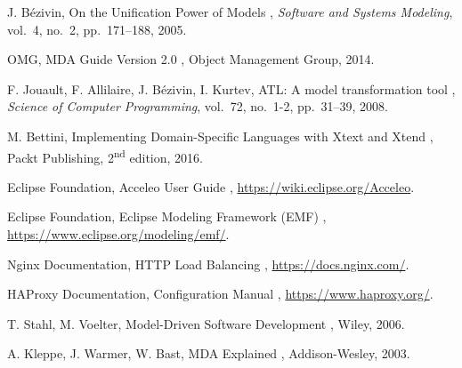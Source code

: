 \documentclass[12pt,a4paper]{report}
\begin{document}
\begin{enumerate}[label={[\arabic*]}]
  \item J. Bézivin, \og On the Unification Power of Models \fg{}, \textit{Software and Systems Modeling}, vol.~4, no.~2, pp.~171--188, 2005.
  \item OMG, \og MDA Guide Version 2.0 \fg{}, Object Management Group, 2014.
  \item F. Jouault, F. Allilaire, J. Bézivin, I. Kurtev, \og ATL: A model transformation tool \fg{}, \textit{Science of Computer Programming}, vol.~72, no.~1-2, pp.~31--39, 2008.
  \item M. Bettini, \og Implementing Domain-Specific Languages with Xtext and Xtend \fg{}, Packt Publishing, 2\textsuperscript{nd} edition, 2016.
  \item Eclipse Foundation, \og Acceleo User Guide \fg{}, \url{https://wiki.eclipse.org/Acceleo}.
  \item Eclipse Foundation, \og Eclipse Modeling Framework (EMF) \fg{}, \url{https://www.eclipse.org/modeling/emf/}.
  \item Nginx Documentation, \og HTTP Load Balancing \fg{}, \url{https://docs.nginx.com/}.
  \item HAProxy Documentation, \og Configuration Manual \fg{}, \url{https://www.haproxy.org/}.
  \item T. Stahl, M. Voelter, \og Model-Driven Software Development \fg{}, Wiley, 2006.
  \item A. Kleppe, J. Warmer, W. Bast, \og MDA Explained \fg{}, Addison-Wesley, 2003.
\end{enumerate}
\end{document}

